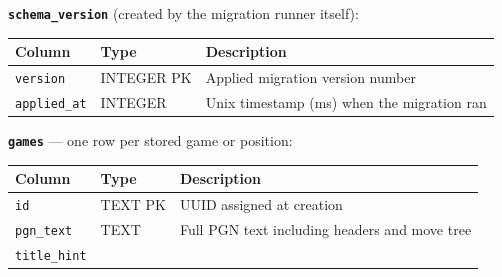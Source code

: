 \documentclass[]{article}
\begin{document}
\textbf{\texttt{schema\_version}} (created by the migration runner
itself):

\begin{longtable}[]{@{}lll@{}}
\toprule
Column & Type & Description\tabularnewline
\midrule
\endhead
\texttt{version} & INTEGER PK & Applied migration version
number\tabularnewline
\texttt{applied\_at} & INTEGER & Unix timestamp (ms) when the migration
ran\tabularnewline
\bottomrule
\end{longtable}

\textbf{\texttt{games}} --- one row per stored game or position:

\begin{longtable}[]{@{}lll@{}}
\toprule
\begin{minipage}[b]{0.05\columnwidth}\raggedright\strut
Column\strut
\end{minipage} & \begin{minipage}[b]{0.05\columnwidth}\raggedright\strut
Type\strut
\end{minipage} & \begin{minipage}[b]{0.05\columnwidth}\raggedright\strut
Description\strut
\end{minipage}\tabularnewline
\midrule
\endhead
\begin{minipage}[t]{0.05\columnwidth}\raggedright\strut
\texttt{id}\strut
\end{minipage} & \begin{minipage}[t]{0.05\columnwidth}\raggedright\strut
TEXT PK\strut
\end{minipage} & \begin{minipage}[t]{0.05\columnwidth}\raggedright\strut
UUID assigned at creation\strut
\end{minipage}\tabularnewline
\begin{minipage}[t]{0.05\columnwidth}\raggedright\strut
\texttt{pgn\_text}\strut
\end{minipage} & \begin{minipage}[t]{0.05\columnwidth}\raggedright\strut
TEXT\strut
\end{minipage} & \begin{minipage}[t]{0.05\columnwidth}\raggedright\strut
Full PGN text including headers and move tree\strut
\end{minipage}\tabularnewline
\begin{minipage}[t]{0.05\columnwidth}\raggedright\strut
\texttt{title\_hint}\strut
\end{minipage} & \begin{minipage}[t]{0.05\columnwidth}\raggedright\strut

\end{minipage}
\end{longtable}
\end{document}
